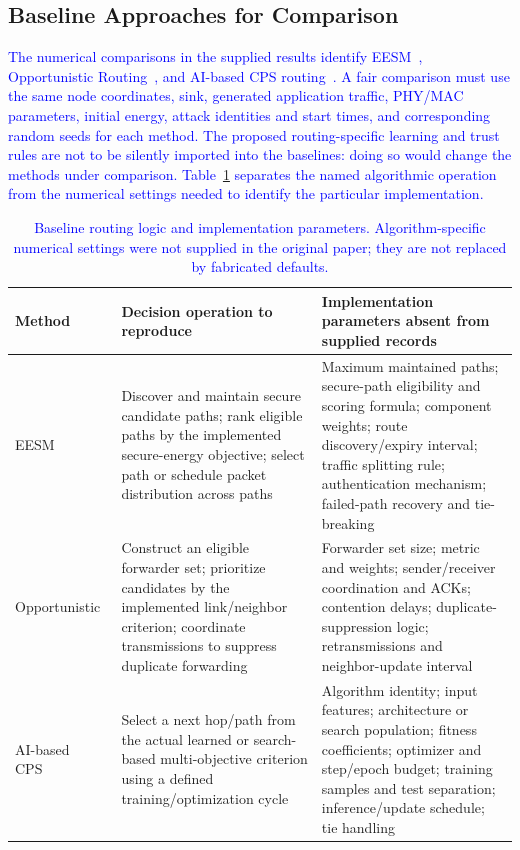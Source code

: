 \documentclass[pdflatex,sn-mathphys-num]{sn-jnl}
\newcommand{\Revised}[1]{\textcolor{blue}{#1}}
\begin{document}
\subsection{Baseline Approaches for Comparison}
\label{sec:baseline_r2}
\Revised{The numerical comparisons in the supplied results identify EESM~\cite{biswas2023eesm}, Opportunistic Routing~\cite{narayana2026secure}, and AI-based CPS routing~\cite{wong2025sustainable}. A fair comparison must use the same node coordinates, sink, generated application traffic, PHY/MAC parameters, initial energy, attack identities and start times, and corresponding random seeds for each method. The proposed routing-specific learning and trust rules are not to be silently imported into the baselines: doing so would change the methods under comparison. Table~\ref{tab:baselineconfig} separates the named algorithmic operation from the numerical settings needed to identify the particular implementation.}

\begin{table}[ht]
\centering\small
\caption{\Revised{Baseline routing logic and implementation parameters. Algorithm-specific numerical settings were not supplied in the original paper; they are not replaced by fabricated defaults.}}
\label{tab:baselineconfig}
\begin{tabular}{p{}p{}p{}}
\toprule
\textbf{Method} & \textbf{Decision operation to reproduce} & \textbf{Implementation parameters absent from supplied records}\\
\midrule
EESM~\cite{biswas2023eesm} & Discover and maintain secure candidate paths; rank eligible paths by the implemented secure-energy objective; select path or schedule packet distribution across paths & Maximum maintained paths; secure-path eligibility and scoring formula; component weights; route discovery/expiry interval; traffic splitting rule; authentication mechanism; failed-path recovery and tie-breaking\\
Opportunistic~\cite{narayana2026secure} & Construct an eligible forwarder set; prioritize candidates by the implemented link/neighbor criterion; coordinate transmissions to suppress duplicate forwarding & Forwarder set size; metric and weights; sender/receiver coordination and ACKs; contention delays; duplicate-suppression logic; retransmissions and neighbor-update interval\\
AI-based CPS~\cite{wong2025sustainable} & Select a next hop/path from the actual learned or search-based multi-objective criterion using a defined training/optimization cycle & Algorithm identity; input features; architecture or search population; fitness coefficients; optimizer and step/epoch budget; training samples and test separation; inference/update schedule; tie handling\\
\bottomrule
\end{tabular}
\end{table}
\end{document}

